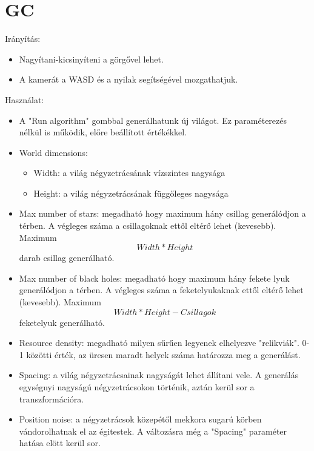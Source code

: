 \section{GC}
Irányítás:
\begin{itemize}
    \label{item:GC-iranyitas}
        \item Nagyítani-kicsinyíteni a görgővel lehet.
        \item A kamerát a WASD és a nyilak segítségével mozgathatjuk.
\end{itemize}
Használat:
\begin{itemize}
    \label{item:GC-hasznalat}
        \item A "Run algorithm" gombbal generálhatunk új világot. Ez paraméterezés nélkül is működik, előre beállított értékékkel.
        \item World dimensions: 
        \begin{itemize}
            \item Width: a világ négyzetrácsának vízszintes nagysága
            \item Height: a világ négyzetrácsának függőleges nagysága
        \end{itemize}
        \item Max number of stars: megadható hogy maximum hány csillag generálódjon a térben. A végleges száma a csillagoknak ettől eltérő lehet (kevesebb). Maximum $$Width * Height$$ darab csillag generálható.
        \item Max number of black holes: megadható hogy maximum hány fekete lyuk generálódjon a térben. A végleges száma a feketelyukaknak ettől eltérő lehet (kevesebb). Maximum $$Width * Height - Csillagok$$ feketelyuk generálható.
        \item Resource density: megadható milyen sűrűen legyenek elhelyezve "relikviák". 0-1 közötti érték, az üresen maradt helyek száma határozza meg a generálást.
        \item Spacing: a világ négyzetrácsainak nagyságát lehet állítani vele. A generálás egységnyi nagyságú négyzetrácsokon történik, aztán kerül sor a transzformációra.
        \item Position noise: a négyzetrácsok közepétől mekkora sugarú körben vándorolhatnak el az égitestek. A változásra még a "Spacing" paraméter hatása elött kerül sor.
\end{itemize}

